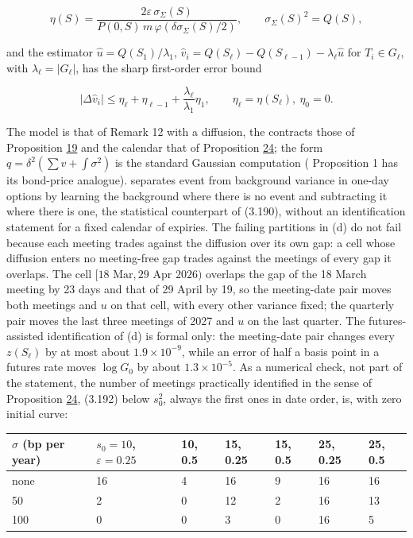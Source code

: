 \documentclass[11pt]{article}
\begin{document}
\begin{equation*}
\eta(S)=\frac{2\varepsilon\,\sigma_\Sigma(S)}{P(0,S)\,m\,\varphi(\delta\sigma_\Sigma(S)/2)},\qquad\sigma_\Sigma(S)^2=Q(S), \tag{3.191}\label{eq:3.191}
\end{equation*}

and the estimator \(\hat u=Q(S_1)/\lambda_1\), \(\hat v_i=Q(S_\ell)-Q(S_{\ell-1})-\lambda_\ell\hat u\) for \(T_i\in G_\ell\), with \(\lambda_\ell=|G_\ell|\), has the sharp first-order error bound

\begin{equation*}
|\Delta\hat v_i|\le\eta_\ell+\eta_{\ell-1}+\frac{\lambda_\ell}{\lambda_1}\eta_1,\qquad\eta_\ell=\eta(S_\ell),\ \eta_0=0. \tag{3.192}\label{eq:3.192}
\end{equation*}

The model is that of Remark 12 with a diffusion, the contracts those of Proposition \hyperref[res:Proposition-19]{19} and the calendar that of Proposition \hyperref[res:Proposition-24]{24}; the form \(q=\delta^2(\sum v+\int\sigma^2)\) is the standard Gaussian computation (\cite{kim2014jumps} Proposition 1 has its bond-price analogue). \cite{wright2020event} separates event from background variance in one-day options by learning the background where there is no event and subtracting it where there is one, the statistical counterpart of (3.190), without an identification statement for a fixed calendar of expiries. The failing partitions in (d) do not fail because each meeting trades against the diffusion over its own gap: a cell whose diffusion enters no meeting-free gap trades against the meetings of every gap it overlaps. The cell \([18\text{ Mar},29\text{ Apr }2026)\) overlaps the gap of the 18 March meeting by 23 days and that of 29 April by 19, so the meeting-date pair moves both meetings and \(u\) on that cell, with every other variance fixed; the quarterly pair moves the last three meetings of 2027 and \(u\) on the last quarter. The futures-assisted identification of (d) is formal only: the meeting-date pair changes every \(z(S_\ell)\) by at most about \(1.9\times10^{-9}\), while an error of half a basis point in a futures rate moves \(\log G_0\) by about \(1.3\times10^{-5}\). As a numerical check, not part of the statement, the number of meetings practically identified in the sense of Proposition \hyperref[res:Proposition-24]{24}, (3.192) below \(s_0^2\), always the first ones in date order, is, with zero initial curve:

{\scriptsize
\begin{longtable}{lllllll}
\toprule
\textbf{\(\sigma\) (bp per year)} & \textbf{\(s_0=10\), \(\varepsilon=0.25\)} & \textbf{10, 0.5} & \textbf{15, 0.25} & \textbf{15, 0.5} & \textbf{25, 0.25} & \textbf{25, 0.5} \\
\midrule
\endhead
\bottomrule
\endlastfoot
none & 16 & 4 & 16 & 9 & 16 & 16 \\
50 & 2 & 0 & 12 & 2 & 16 & 13 \\
100 & 0 & 0 & 3 & 0 & 16 & 5 \\
\end{longtable}}
\end{document}
